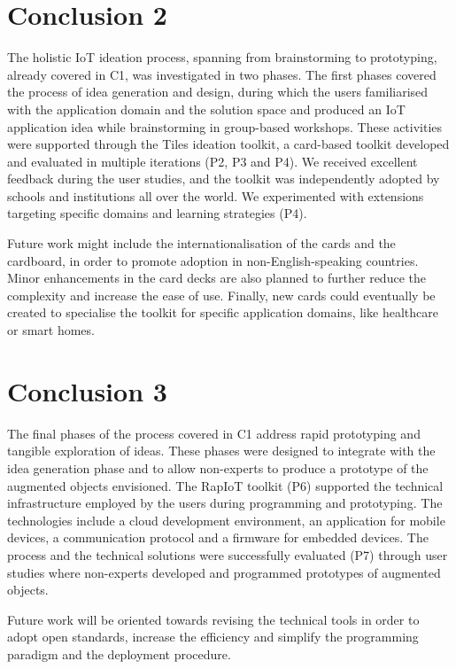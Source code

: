\section*{Conclusion 2}

The holistic IoT ideation process, spanning from brainstorming to prototyping, already covered in C1, was investigated in two phases. The first phases covered the process of idea generation and design, during which the users familiarised with the application domain and the solution space and produced an IoT application idea while brainstorming in group-based workshops. These activities were supported through the Tiles ideation toolkit, a card-based toolkit developed and evaluated in multiple iterations (P2, P3 and P4).
We received excellent feedback during the user studies, and the toolkit was independently adopted by schools and institutions all over the world. We experimented with extensions targeting specific domains and learning strategies (P4).

Future work might include the internationalisation of the cards and the cardboard, in order to promote adoption in non-English-speaking countries. Minor enhancements in the card decks are also planned to further reduce the complexity and increase the ease of use. Finally, new cards could eventually be created to specialise the toolkit for specific application domains, like healthcare or smart homes.


\section*{Conclusion 3}

The final phases of the process covered in C1 address rapid prototyping and tangible exploration of ideas. These phases were designed to integrate with the idea generation phase and to allow non-experts to produce a prototype of the augmented objects envisioned. The RapIoT toolkit (P6) supported the technical infrastructure employed by the users during programming and prototyping. The technologies include a cloud development environment, an application for mobile devices, a communication protocol and a firmware for embedded devices. The process and the technical solutions were successfully evaluated (P7) through user studies where non-experts developed and programmed prototypes of augmented objects.

Future work will be oriented towards revising the technical tools in order to adopt open standards, increase the efficiency and simplify the programming paradigm and the deployment procedure.


